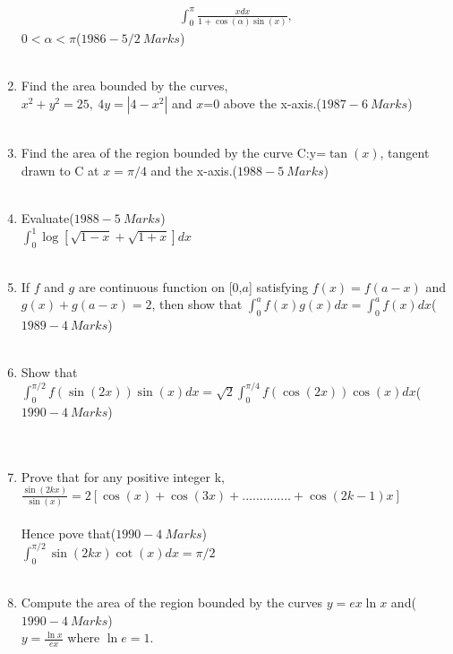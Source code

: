 \documentclass[journal,12pt,twocolumn]{IEEEtran}
\theoremstyle{remark}
\begin{document}
\begin{enumerate}
\begin{align*}
    \int_{0}^{\pi}\frac{xdx}{1+\cos{(\alpha)}\sin{(x)}},
\end{align*}$0<\alpha<\pi$\hfill($1986-5/2\ Marks$)\\\\
\item Find the area bounded by the curves,\\ $x^2+y^2=25,\ 4y=|4-x^2|$ and $x$=0 above the x-axis.\hfill($1987-6\ Marks$)\\\\
\item Find the area of the region bounded by the curve C:y=$\tan{(x)}$, tangent drawn to C at $x=\pi/4$ and the x-axis.\hfill($1988-5\ Marks$)\\\\
\item Evaluate\hfill($1988-5\ Marks$)\\$\int_{0}^{1}\log[\sqrt{1-x}+\sqrt{1+x}]dx$\\\\
\item If $f$ and $g$ are continuous function on [0,$a$] satisfying $f(x)=f(a-x)$ and\\$g(x)+g(a-x)=2$, then show that $\int_{0}^{a}f(x)g(x)dx = \int_{0}^{a}f(x)dx$\hfill($1989-4\ Marks$)\\\\
\item Show that $\int_{0}^{\pi/2}f(\sin{(2x)})\sin{(x)}dx=\sqrt{2}\int_{0}^{\pi/4}f(\cos{(2x)})\cos{(x)}dx$\hfill($1990-4\ Marks$)\\\\\\
\item Prove that for any positive integer k, $\frac{\sin{(2kx)}}{\sin{(x)}}=2[\cos{(x)}+\cos{(3x)}+..............+\cos{(2k-1)x}]$\\\\Hence pove that\hfill($1990-4\ Marks$)\\ $\int_{0}^{\pi/2}\sin{(2kx)}\cot{(x)}dx=\pi/2$\\\\
\item Compute the area of the region bounded by the curves $y=ex\ln{x}$ and\hfill($1990-4\ Marks$)\\$y=\frac{\ln{x}}{ex}$ where $\ln{e}=1$.\\\\
\end{enumerate}
\end{document}
